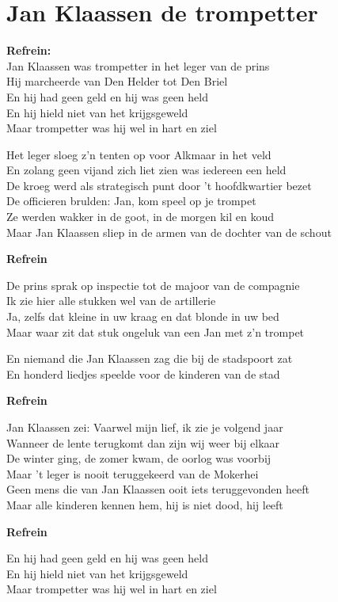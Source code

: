 \section{Jan Klaassen de trompetter}
\textbf{Refrein:}\\
Jan Klaassen was trompetter in het leger van de prins\\
Hij marcheerde van Den Helder tot Den Briel\\
En hij had geen geld en hij was geen held\\
En hij hield niet van het krijgsgeweld\\
Maar trompetter was hij wel in hart en ziel

Het leger sloeg z'n tenten op voor Alkmaar in het veld\\
En zolang geen vijand zich liet zien was iedereen een held\\
De kroeg werd als strategisch punt door 't hoofdkwartier bezet\\
De officieren brulden: Jan, kom speel op je trompet\\
Ze werden wakker in de goot, in de morgen kil en koud\\
Maar Jan Klaassen sliep in de armen van de dochter van de schout

\textbf{Refrein}

De prins sprak op inspectie tot de majoor van de compagnie\\
Ik zie hier alle stukken wel van de artillerie\\
Ja, zelfs dat kleine in uw kraag en dat blonde in uw bed\\
Maar waar zit dat stuk ongeluk van een Jan met z'n trompet

En niemand die Jan Klaassen zag die bij de stadspoort zat\\
En honderd liedjes speelde voor de kinderen van de stad

\textbf{Refrein}

Jan Klaassen zei: Vaarwel mijn lief, ik zie je volgend jaar\\
Wanneer de lente terugkomt dan zijn wij weer bij elkaar\\
De winter ging, de zomer kwam, de oorlog was voorbij\\
Maar 't leger is nooit teruggekeerd van de Mokerhei\\
Geen mens die van Jan Klaassen ooit iets teruggevonden heeft\\
Maar alle kinderen kennen hem, hij is niet dood, hij leeft

\textbf{Refrein}

En hij had geen geld en hij was geen held\\
En hij hield niet van het krijgsgeweld\\
Maar trompetter was hij wel in hart en ziel
